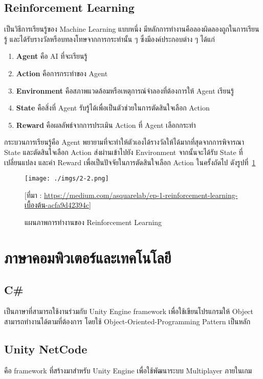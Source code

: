 \documentclass[12pt,oneside,openright,a4paper]{cpe-thai-project}
\begin{document}
\pagebreak
\subsection{Reinforcement Learning}
เป็นวิธีการเรียนรู้ของ Machine Learning แบบหนึ่ง 
มีหลักการทำงานคือลองผิดลองถูกในการเรียนรู้ และได้รับรางวัลหรือบทลงโทษจากการกระทำนั้น ๆ 
ซึ่งมีองค์ประกอบต่าง ๆ ได้แก่
\begin{enumerate}
  \item \textbf{Agent} คือ AI ที่จะเรียนรู้
  \item \textbf{Action} คือการกระทำของ Agent
  \item \textbf{Environment} คือสภาพแวดล้อมหรือเหตุการณ์จำลองที่ต้องการให้ Agent เรียนรู้
  \item \textbf{State} คือสิ่งที่ Agent รับรู้ได้เพื่อเป็นตัวช่วยในการตัดสินใจเลือก Action
  \item \textbf{Reward} คือผลลัพธ์จากการประเมิน Action ที่ Agent เลือกกระทำ
\end{enumerate}

กระบวนการเรียนรู้คือ Agent พยายามที่จะทำให้ตัวเองได้รางวัลให้ได้มากที่สุดจากการพิจารณา 
State และตัดสินใจเลือก Action ส่งผ่านเข้าไปยัง Environment จากนั้นจะได้รับ State 
ที่เปลี่ยนแปลง และค่า Reward เพื่อเป็นปัจจัยในการตัดสินใจเลือก Action ในครั้งถัดไป ดังรูปที่~\ref{fig:2-2}

\begin{figure}[H]\centering
  \texttt{[image: ./imgs/2-2.png]}
  \caption{แผนภาพการทำงานของ Reinforcement Learning}\label{fig:2-2}
  \small [ที่มา : \url{https://medium.com/asquarelab/ep-1-reinforcement-learning-เบื้องต้น-acfa9d42394c}]
\end{figure}

\pagebreak
\section{ภาษาคอมพิวเตอร์และเทคโนโลยี}

\subsection{C\#}
เป็นภาษาที่สามารถใช้งานร่วมกับ Unity Engine framework 
เพื่อใช้เขียนโปรแกรมให้ Object สามารถทำงานได้ตามที่ต้องการ 
โดยใช้ Object-Oriented-Programming Pattern เป็นหลัก
\subsection{Unity NetCode}
คือ framework ที่สร้างมาสำหรับ Unity Engine เพื่อใช้พัฒนาระบบ 
Multiplayer ภายในเกม 
\end{document}
